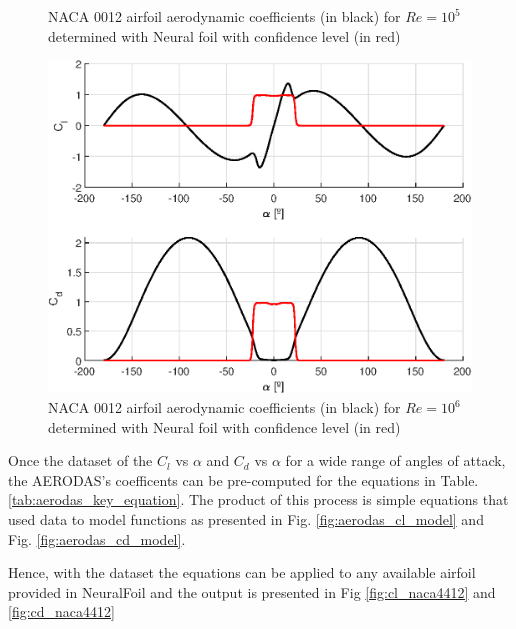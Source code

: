 \begin{figure}[!htb]
\begin{minipage}{0.3\textwidth}
		\caption[NACA 0012 airfoil aerodynamic coefficients for $Re=10^5$ determined with Neural foil with confidence level]{NACA 0012 airfoil aerodynamic coefficients (in black) for $Re=10^5$determined with Neural foil with confidence level (in red)}
		\label{fig:aero_model_1e5}
	\end{minipage}
    \hfill
    \begin{minipage}{0.3\textwidth}
		\centering
		\includegraphics[width=\textwidth]{Figures/background/aero/aero_model_1e6.eps}
		\caption[NACA 0012 airfoil aerodynamic coefficients for $Re=10^6$ determined with Neural foil with confidence level]{NACA 0012 airfoil aerodynamic coefficients  (in black) for $Re=10^6$ determined with Neural foil with confidence level (in red)} 
		\label{fig:aero_model_1e6}
	\end{minipage}
\end{figure}

Once the dataset of the $C_l$ vs $\alpha$ and $C_d$ vs $\alpha$ for a wide range of angles of attack, the AERODAS's coefficents can be pre-computed for the equations in Table. \ref{tab:aerodas_key_equation}. The product of this process is simple equations that used data to model functions as presented in Fig. \ref{fig:aerodas_cl_model} and Fig. \ref{fig:aerodas_cd_model}.

Hence, with the dataset the equations can be applied to any available airfoil provided in NeuralFoil and the output is presented in Fig \ref{fig:cl_naca4412} and \ref{fig:cd_naca4412}

